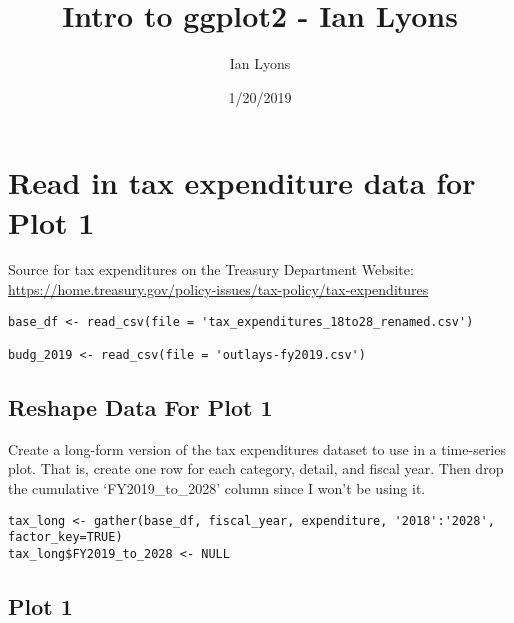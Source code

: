 \documentclass[]{article}
\title{Intro to ggplot2 - Ian Lyons}
\author{Ian Lyons}
\date{1/20/2019}
\begin{document}
\maketitle

\hypertarget{read-in-tax-expenditure-data-for-plot-1}{%
\section{Read in tax expenditure data for Plot
1}\label{read-in-tax-expenditure-data-for-plot-1}}

Source for tax expenditures on the Treasury Department Website:
\url{https://home.treasury.gov/policy-issues/tax-policy/tax-expenditures}

\begin{verbatim}
base_df <- read_csv(file = 'tax_expenditures_18to28_renamed.csv')

budg_2019 <- read_csv(file = 'outlays-fy2019.csv')
\end{verbatim}

\hypertarget{reshape-data-for-plot-1}{%
\subsection{Reshape Data For Plot 1}\label{reshape-data-for-plot-1}}

Create a long-form version of the tax expenditures dataset to use in a
time-series plot. That is, create one row for each category, detail, and
fiscal year. Then drop the cumulative `FY2019\_to\_2028' column since I
won't be using it.

\begin{verbatim}
tax_long <- gather(base_df, fiscal_year, expenditure, '2018':'2028', factor_key=TRUE)
tax_long$FY2019_to_2028 <- NULL
\end{verbatim}

\hypertarget{plot-1}{%
\subsection{Plot 1}\label{plot-1}}
\end{document}
